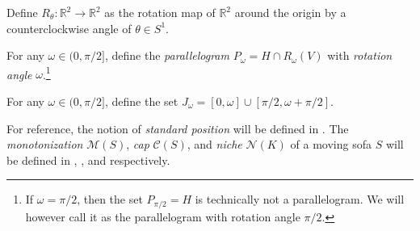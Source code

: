 \begin{definition}

Define \(R_\theta : \mathbb{R}^2 \to \mathbb{R}^2\) as the rotation map of \(\mathbb{R}^2\) around the origin by a counterclockwise angle of \(\theta \in S^1\).

\label{def:rotation-map}
\end{definition}

\begin{definition}

For any \(\omega \in (0, \pi/2]\), define the \emph{parallelogram} \(P_\omega = H \cap R_\omega(V)\) with \emph{rotation angle} \(\omega\).\footnote{If \(\omega = \pi/2\), then the set \(P_{\pi/2} = H\) is technically not a parallelogram. We will however call it as the parallelogram with rotation angle \(\pi/2\).}

\label{def:parallelogram}
\end{definition}

\begin{definition}

For any \(\omega \in (0, \pi/2]\), define the set \(J_\omega = [0, \omega] \cup [\pi/2, \omega + \pi/2]\).

\label{def:j-cap}
\end{definition}

For reference, the notion of \emph{standard position} will be defined in . The \emph{monotonization} \(\mathcal{M}(S)\), \emph{cap} \(\mathcal{C}(S)\), and \emph{niche} \(\mathcal{N}(K)\) of a moving sofa \(S\) will be defined in , , and  respectively.